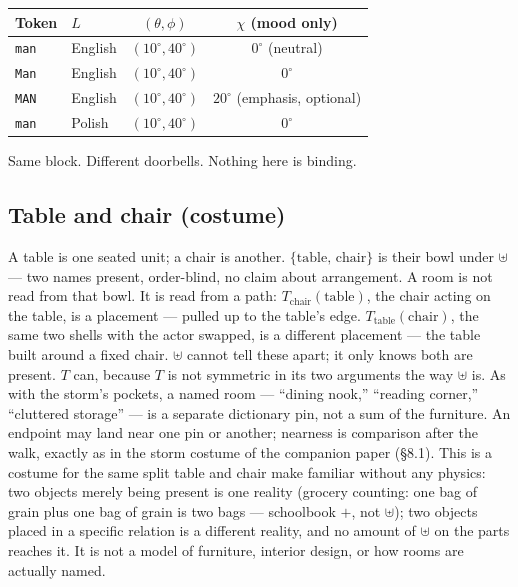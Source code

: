\documentclass[12pt, a4paper]{article}
\begin{document}
\begin{center}
\begin{tabular}{llcc}
Token & $L$ & $(\theta,\phi)$ & $\chi$ (mood only) \\
\hline
\texttt{man} & English & $(10^\circ,40^\circ)$ & $0^\circ$ (neutral) \\
\texttt{Man} & English & $(10^\circ,40^\circ)$ & $0^\circ$ \\
\texttt{MAN} & English & $(10^\circ,40^\circ)$ & $20^\circ$ (emphasis, optional) \\
\texttt{man} & Polish  & $(10^\circ,40^\circ)$ & $0^\circ$ \\
\end{tabular}
\end{center}

Same block. Different doorbells. Nothing here is binding.


\subsection{Table and chair (costume)}
\label{subsec:table_chair}
A table is one seated unit; a chair is another. $\{\mathrm{table},\,\mathrm{chair}\}$
is their bowl under $\uplus$ --- two names present, order-blind, no
claim about arrangement. A room is not read from that bowl. It is
read from a path: $T_{\mathrm{chair}}(\mathrm{table})$, the chair
acting on the table, is a placement --- pulled up to the table's edge.
$T_{\mathrm{table}}(\mathrm{chair})$, the same two shells with the
actor swapped, is a different placement --- the table built around
a fixed chair. $\uplus$ cannot tell these apart; it only knows both
are present. $T$ can, because $T$ is not symmetric in its two
arguments the way $\uplus$ is. As with the storm's pockets, a named
room --- ``dining nook,'' ``reading corner,'' ``cluttered storage''
--- is a separate dictionary pin, not a sum of the furniture. An
endpoint may land near one pin or another; nearness is comparison
after the walk, exactly as in the storm costume of the companion paper (\S8.1).
This is a costume for the same split table and chair make familiar
without any physics: two objects merely being present is one
reality (grocery counting: one bag of grain plus one bag of grain is
two bags --- schoolbook $+$, not $\uplus$); two objects placed
in a specific relation is a different reality, and no amount of
$\uplus$ on the parts reaches it. It is not a model of furniture,
interior design, or how rooms are actually named.
\end{document}
